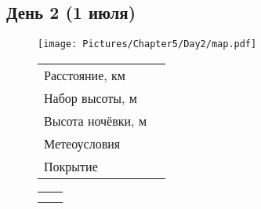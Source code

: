 \graphicspath{{Pictures/Chapter5/Day2}}

\subsection{День 2 (1 июля)}\label{subsec:Day2}
    \begin{figure}[ht]
        \centering
        \texttt{[image: Pictures/Chapter5/Day2/map.pdf]}\label{fig:Day2_map}

        \begin{tabular}{|p{4.5cm}|>{\centering\arraybackslash}p{4cm}|}
            \hline
            Расстояние, км		&       \\
            Набор высоты, м		&       \\
            Высота ночёвки, м	&       \\
            Метеоусловия		&       \\
            Покрытие			&       \\
            \hline
        \end{tabular}\quad
        \begin{tabular}{|p{5cm}|>{\centering\arraybackslash}p{1.5cm}|}
            \hline
            	&		\\			
            \hline
                &       \\
                &		\\
            \hline
        \end{tabular}
    \end{figure}



    \FloatBarrier
